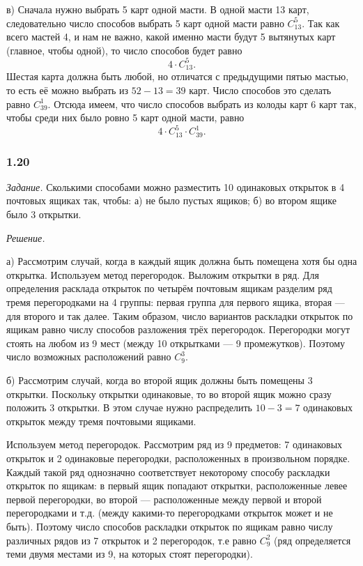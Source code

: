 \documentclass{book}
\begin{document}
в) Сначала нужно выбрать 5 карт одной масти.
В одной масти 13 карт, следовательно число способов выбрать 5 карт одной масти равно $ C_{13}^5 $.
Так как всего мастей 4, и нам не важно, какой именно масти будут 5 вытянутых карт (главное, чтобы одной), то число способов будет равно
$$ 4 \cdot C_{13}^5.$$
Шестая карта должна быть любой, но отличатся с предыдущими пятью мастью, то есть её можно выбрать из $ 52 - 13 = 39 $ карт.
Число способов это сделать равно $ C_{39}^1 $.
Отсюда имеем, что число способов выбрать из колоды карт 6 карт так, чтобы среди них было ровно 5 карт одной масти, равно
$$ 4 \cdot C_{13}^5 \cdot C_{39}^1.$$

\subsubsection*{1.20}

\textit{Задание.} Сколькими способами можно разместить 10 одинаковых открыток в 4 почтовых ящиках так, чтобы:
а) не было пустых ящиков;
б) во втором ящике было 3 открытки.

\textit{Решение.}

а) Рассмотрим случай, когда в каждый ящик должна быть помещена хотя бы одна открытка.
Используем метод перегородок.
Выложим открытки в ряд.
Для определения расклада открыток по четырём почтовым ящикам разделим ряд тремя перегородками на 4 группы:
первая группа для первого ящика, вторая --- для второго и так далее.
Таким образом, число вариантов раскладки открыток по ящикам равно числу способов разложения трёх перегородок.
Перегородки могут стоять на любом из 9 мест (между 10 открытками --- 9 промежутков).
Поэтому число возможных расположений равно $ C_9^3 $.

б) Рассмотрим случай, когда во второй ящик должны быть помещены 3 открытки.
Поскольку открытки одинаковые, то во второй ящик можно сразу положить 3 открытки.
В этом случае нужно распределить $ 10 - 3 = 7$ одинаковых открыток между тремя почтовыми ящиками.

Используем метод перегородок.
Рассмотрим ряд из 9 предметов: 7 одинаковых открыток и 2 одинаковые перегородки, расположенных в произвольном порядке.
Каждый такой ряд однозначно соответствует некоторому способу раскладки открыток по ящикам:
в первый ящик попадают открытки, расположенные левее первой перегородки,
во второй --- расположенные между первой и второй перегородками и т.д. (между какими-то перегородками открыток может и не быть).
Поэтому число способов раскладки открыток по ящикам равно числу различных рядов из 7 открыток и 2 перегородок,
т.е равно $ C_9^2 $ (ряд определяется теми двумя местами из 9, на которых стоят перегородки).
\end{document}
